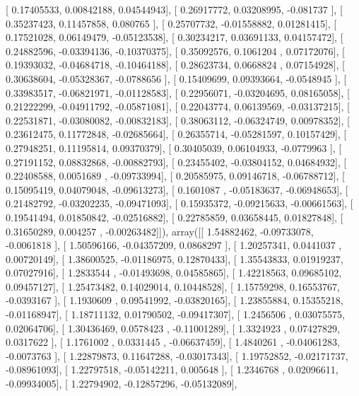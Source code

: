 \documentclass{article}
\begin{document}
       [ 0.17405533,  0.00842188,  0.04544943],
       [ 0.26917772,  0.03208995, -0.081737  ],
       [ 0.35237423,  0.11457858,  0.080765  ],
       [ 0.25707732, -0.01558882,  0.01281415],
       [ 0.17521028,  0.06149479, -0.05123538],
       [ 0.30234217,  0.03691133,  0.04157472],
       [ 0.24882596, -0.03394136, -0.10370375],
       [ 0.35092576,  0.1061204 ,  0.07172076],
       [ 0.19393032, -0.04684718, -0.10464188],
       [ 0.28623734,  0.0668824 ,  0.07154928],
       [ 0.30638604, -0.05328367, -0.0788656 ],
       [ 0.15409699,  0.09393664, -0.0548945 ],
       [ 0.33983517, -0.06821971, -0.01128583],
       [ 0.22956071, -0.03204695,  0.08165058],
       [ 0.21222299, -0.04911792, -0.05871081],
       [ 0.22043774,  0.06139569, -0.03137215],
       [ 0.22531871, -0.03080082, -0.00832183],
       [ 0.38063112, -0.06324749,  0.00978352],
       [ 0.23612475,  0.11772848, -0.02685664],
       [ 0.26355714, -0.05281597,  0.10157429],
       [ 0.27948251,  0.11195814,  0.09370379],
       [ 0.30405039,  0.06104933, -0.0779963 ],
       [ 0.27191152,  0.08832868, -0.00882793],
       [ 0.23455402, -0.03804152,  0.04684932],
       [ 0.22408588,  0.0051689 , -0.09733994],
       [ 0.20585975,  0.09146718, -0.06788712],
       [ 0.15095419,  0.04079048, -0.09613273],
       [ 0.1601087 , -0.05183637, -0.06948653],
       [ 0.21482792, -0.03202235, -0.09471093],
       [ 0.15935372, -0.09215633, -0.00661563],
       [ 0.19541494,  0.01850842, -0.02516882],
       [ 0.22785859,  0.03658445,  0.01827848],
       [ 0.31650289,  0.004257  , -0.00263482]]), array([[ 1.54882462, -0.09733078, -0.0061818 ],
       [ 1.50596166, -0.04357209,  0.0868297 ],
       [ 1.20257341,  0.0441037 ,  0.00720149],
       [ 1.38600525, -0.01186975,  0.12870433],
       [ 1.35543833,  0.01919237,  0.07027916],
       [ 1.2833544 , -0.01493698,  0.04585865],
       [ 1.42218563,  0.09685102,  0.09457127],
       [ 1.25473482,  0.14029014,  0.10448528],
       [ 1.15759298,  0.16553767, -0.0393167 ],
       [ 1.1930609 ,  0.09541992, -0.03820165],
       [ 1.23855884,  0.15355218, -0.01168947],
       [ 1.18711132,  0.01790502, -0.09417307],
       [ 1.2456506 ,  0.03075575,  0.02064706],
       [ 1.30436469,  0.0578423 , -0.11001289],
       [ 1.3324923 ,  0.07427829,  0.0317622 ],
       [ 1.1761002 ,  0.0331445 , -0.06637459],
       [ 1.4840261 , -0.04061283, -0.0073763 ],
       [ 1.22879873,  0.11647288, -0.03017343],
       [ 1.19752852, -0.02171737, -0.08961093],
       [ 1.22797518, -0.05142211,  0.005648  ],
       [ 1.2346768 ,  0.02096611, -0.09934005],
       [ 1.22794902, -0.12857296, -0.05132089],
\end{document}

